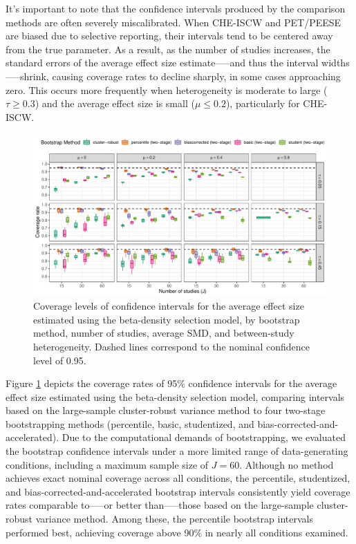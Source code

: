 \documentclass[
  man, donotrepeattitle,floatsintext]{apa7}
\begin{document}
It's important to note that the confidence intervals produced by the comparison methods are often severely miscalibrated. When CHE-ISCW and PET/PEESE are biased due to selective reporting, their intervals tend to be centered away from the true parameter. As a result, as the number of studies increases, the standard errors of the average effect size estimate-----and thus the interval widths-----shrink, causing coverage rates to decline sharply, in some cases approaching zero. This occurs more frequently when heterogeneity is moderate to large (\(\tau \geq 0.3\)) and the average effect size is small (\(\mu \leq 0.2\)), particularly for CHE-ISCW.

\begin{figure}
\includegraphics{beta-function-selection-models-with-dependent-effects_files/figure-latex/Beta-coverage-main-1} \caption{Coverage levels of confidence intervals for the average effect size estimated using the beta-density selection model, by bootstrap method, number of studies, average SMD, and between-study heterogeneity. Dashed lines correspond to the nominal confidence level of 0.95.}\label{fig:Beta-coverage-main}
\end{figure}

Figure \ref{fig:Beta-coverage-main} depicts the coverage rates of 95\% confidence intervals for the average effect size estimated using the beta-density selection model, comparing intervals based on the large-sample cluster-robust variance method to four two-stage bootstrapping methods (percentile, basic, studentized, and bias-corrected-and-accelerated).
Due to the computational demands of bootstrapping, we evaluated the bootstrap confidence intervals under a more limited range of data-generating conditions, including a maximum sample size of \(J = 60\).
Although no method achieves exact nominal coverage across all conditions, the percentile, studentized, and bias-corrected-and-accelerated bootstrap intervals consistently yield coverage rates comparable to-----or better than-----those based on the large-sample cluster-robust variance method.
Among these, the percentile bootstrap intervals performed best, achieving coverage above 90\% in nearly all conditions examined.
\end{document}
